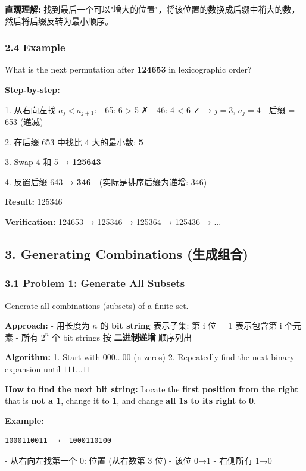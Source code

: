 \documentclass[10pt,a4paper,openany]{ctexbook}
\theoremstyle{definition}
\theoremstyle{remark}
\renewenvironment{quote}
  {\list{}{\leftmargin=1em\rightmargin=0pt\topsep=0.5pt\partopsep=0pt}\item[]}
  {\endlist}
\begin{document}
\textbf{直观理解:} 找到最后一个可以"增大的位置"，将该位置的数换成后缀中稍大的数，然后将后缀反转为最小顺序。
\subsubsection{2.4 Example}

\begin{quote}
What is the next permutation after \textbf{124653} in lexicographic order?

\textbf{Step-by-step:}

1. 从右向左找 $a_j < a_{j+1}$:
- 65: 6 > 5 ✗
- 46: 4 < 6 ✓ → $j = 3$, $a_j = 4$
- 后缀 = 653 (递减)

2. 在后缀 653 中找比 4 大的最小数: \textbf{5}

3. Swap 4 和 5 → \textbf{125643}

4. 反置后缀 643 → \textbf{346}
- (实际是排序后缀为递增: 346)

\textbf{Result:} 125346

\textbf{Verification:} 124653 → 125346 → 125364 → 125436 → ...

\end{quote}
\vspace{-2pt}

\subsection{3. Generating Combinations (生成组合)}

\subsubsection{3.1 Problem 1: Generate All Subsets}

\begin{quote}
Generate all combinations (subsets) of a finite set.

\textbf{Approach:}
- 用长度为 $n$ 的 \textbf{bit string} 表示子集: 第 i 位 = 1 表示包含第 i 个元素
- 所有 $2^n$ 个 bit strings 按 \textbf{二进制递增} 顺序列出

\textbf{Algorithm:}
1. Start with $000\ldots00$ (n zeros)
2. Repeatedly find the next binary expansion until $111\ldots11$

\textbf{How to find the next bit string:}
Locate the \textbf{first position from the right} that is \textbf{not a 1}, change it to \textbf{1}, and change \textbf{all 1s to its right} to \textbf{0}.

\textbf{Example:}
{\footnotesize\begin{verbatim}
1000110011  →  1000110100
\end{verbatim}}

- 从右向左找第一个 0: 位置 (从右数第 3 位)
- 该位 0→1
- 右侧所有 1→0

\end{quote}
\end{document}
